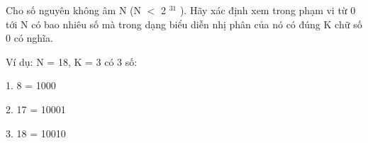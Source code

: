 Cho số nguyên không âm N (N $<$ 2   $^    31   $   ). Hãy xác định xem trong phạm vi từ 0 tới N có bao nhiêu số mà trong dạng biểu diễn nhị phân của nó có đúng K chữ số 0 có nghĩa.  

   Ví dụ: N = 18, K = 3 có 3 số:  

   1. 8 = 1000  

   2. 17 = 10001  

   3. 18 = 10010  

\